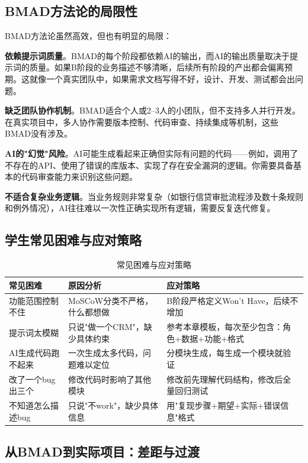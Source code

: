 \subsection{BMAD方法论的局限性}

BMAD方法论虽然高效，但也有明显的局限：

\textbf{依赖提示词质量}。BMAD的每个阶段都依赖AI的输出，而AI的输出质量取决于提示词的质量。如果B阶段的业务描述不够清晰，后续所有阶段的产出都会偏离预期。这就像一个真实团队中，如果需求文档写得不好，设计、开发、测试都会出问题。

\textbf{缺乏团队协作机制}。BMAD适合个人或2--3人的小团队，但不支持多人并行开发。在真实项目中，多人协作需要版本控制、代码审查、持续集成等机制，这些BMAD没有涉及。

\textbf{AI的"幻觉"风险}。AI可能生成看起来正确但实际有问题的代码——例如，调用了不存在的API、使用了错误的库版本、实现了存在安全漏洞的逻辑。你需要具备基本的代码审查能力来识别这些问题。

\textbf{不适合复杂业务逻辑}。当业务规则非常复杂（如银行信贷审批流程涉及数十条规则和例外情况），AI往往难以一次性正确实现所有逻辑，需要反复迭代修复。

\subsection{学生常见困难与应对策略}

\begin{table}[H]
\centering
\begin{tabular}{lp{5cm}p{5cm}}
\toprule
\textbf{常见困难} & \textbf{原因分析} & \textbf{应对策略} \\
\midrule
功能范围控制不住 & MoSCoW分类不严格，什么都想做 & B阶段严格定义Won't Have，后续不增加 \\
提示词太模糊 & 只说"做一个CRM"，缺少具体约束 & 参考本章模板，每次至少包含：角色+数据+功能+格式 \\
AI生成代码跑不起来 & 一次生成太多代码，问题难以定位 & 分模块生成，每生成一个模块就验证 \\
改了一个bug出三个 & 修改代码时影响了其他模块 & 修改前先理解代码结构，修改后全量回归测试 \\
不知道怎么描述bug & 只说"不work"，缺少具体信息 & 用"复现步骤+期望+实际+错误信息"格式 \\
\bottomrule
\end{tabular}
\caption{常见困难与应对策略}
\end{table}

\subsection{从BMAD到实际项目：差距与过渡}

